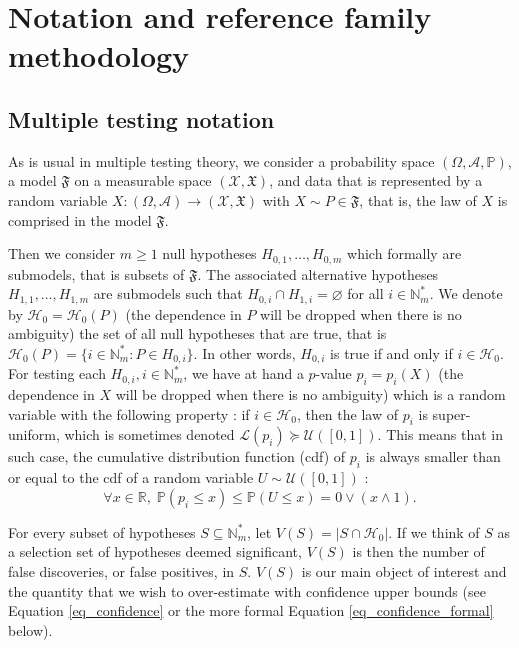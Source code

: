 \documentclass[
  11pt,
  a4paper,
]{article}
\theoremstyle{plain}
\theoremstyle{definition}
\theoremstyle{plain}
\theoremstyle{definition}
\theoremstyle{plain}
\theoremstyle{remark}
\begin{document}
\section{Notation and reference family methodology}\label{sec-notation}

\subsection{Multiple testing notation}\label{multiple-testing-notation}

As is usual in multiple testing theory, we consider a probability space
\((\Omega,\mathcal A, \mathbb P)\), a model \(\mathfrak{F}\) on a
measurable space \((\mathcal{X},\mathfrak{X})\), and data that is
represented by a random variable
\(X:(\Omega,\mathcal A)\to(\mathcal{X},\mathfrak{X})\) with
\(X\sim P\in \mathfrak{F}\), that is, the law of \(X\) is comprised in
the model \(\mathfrak{F}\).

Then we consider \(m\geq1\) null hypotheses \(H_{0,1}, \dotsc, H_{0,m}\)
which formally are submodels, that is subsets of \(\mathfrak{F}\). The
associated alternative hypotheses \(H_{1,1}, \dotsc, H_{1,m}\) are
submodels such that \(H_{0,i}\cap H_{1,i}=\varnothing\) for all
\(i\in\mathbb{N}_m^*\). We denote by \(\mathcal{H}_0=\mathcal{H}_0(P)\)
(the dependence in \(P\) will be dropped when there is no ambiguity) the
set of all null hypotheses that are true, that is
\(\mathcal{H}_0(P)=\{i\in\mathbb{N}_m^* : P\in H_{0,i}\}\). In other
words, \(H_{0,i}\) is true if and only if \(i\in\mathcal{H}_0\). For
testing each \(H_{0,i}, i\in\mathbb{N}_m^*\), we have at hand a
\(p\)-value \(p_i=p_i(X)\) (the dependence in \(X\) will be dropped when
there is no ambiguity) which is a random variable with the following
property : if \(i\in\mathcal{H}_0\), then the law of \(p_i\) is
super-uniform, which is sometimes denoted
\(\mathcal L(p_i)\succeq \mathcal{U}([0,1])\). This means that in such
case, the cumulative distribution function (cdf) of \(p_i\) is always
smaller than or equal to the cdf of a random variable
\(U\sim \mathcal{U}([0,1])\) : \begin{equation}
\forall x \in \mathbb{R},\; \mathbb{P}\left(p_i\leq x\right)\leq \mathbb{P}\left(U\leq x\right) = 0\vee(x\wedge 1).
\label{eq_super_unif}
\end{equation}

For every subset of hypotheses \(S\subseteq\mathbb{N}_m^*\), let
\(V(S)=|S\cap\mathcal{H}_0|\). If we think of \(S\) as a selection set
of hypotheses deemed significant, \(V(S)\) is then the number of false
discoveries, or false positives, in \(S\). \(V(S)\) is our main object
of interest and the quantity that we wish to over-estimate with
confidence upper bounds (see Equation \eqref{eq_confidence} or the more
formal Equation \eqref{eq_confidence_formal} below).
\end{document}
